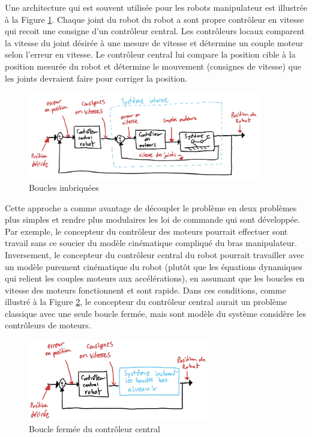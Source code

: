 Une architecture qui est souvent utilisée pour les robots manipulateur est illustrée à la Figure \ref{fig:innerloop}. Chaque joint du robot du robot a sont propre contrôleur en vitesse qui recoit une consigne d'un contrôleur central. Les contrôleurs locaux comparent la vitesse du joint désirée à une mesure de vitesse et détermine un couple moteur selon l'erreur en vitesse. Le contrôleur central lui compare la position cible à la position mesurée du robot et détermine le mouvement (consignes de vitesse) que les joints devraient faire pour corriger la position.
\begin{figure}[htbp]
	\centering
		\includegraphics[width=0.9\textwidth]{fig/innerloop.jpg}
	\caption{Boucles imbriquées}
	\label{fig:innerloop}
\end{figure}

Cette approche a comme avantage de découpler le problème en deux problèmes plus simples et rendre plus modulaires les loi de commande qui sont développée. Par exemple, le concepteur du contrôleur des moteurs pourrait effectuer sont travail sans ce soucier du modèle cinématique compliqué du bras manipulateur. Inversement, le concepteur du contrôleur central du robot pourrait travailler avec un modèle purement cinématique du robot (plutôt que les équations dynamiques qui relient les couples moteurs aux accélérations), en assumant que les boucles en vitesse des moteurs fonctionnent et sont rapide. Dans ces conditions, comme illustré à la Figure \ref{fig:innerloop2}, le concepteur du contrôleur central aurait un problème classique avec une seule boucle fermée, mais sont modèle du système considère les contrôleurs de moteurs. 

\begin{figure}[htbp]
	\centering
		\includegraphics[width=0.7\textwidth]{fig/innerloop2.jpg}
	\caption{Boucle fermée du contrôleur central}
	\label{fig:innerloop2}
\end{figure}

